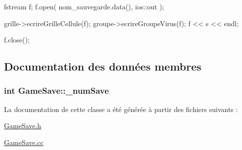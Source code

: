 \begin{DoxyCode}
{
        fstream f;
        f.open( nom_sauvegarde.data(), ios::out );
        
        grille->ecrireGrilleCellule(f);
        groupe->ecrireGroupeVirus(f);
        f << s << endl;
        
        f.close();
}
\end{DoxyCode}


\subsection{Documentation des données membres}
\hypertarget{classGameSave_a4d8d919bdbe2b6a4d77214ef066b6cc1}{
\subsubsection[{\_\-numSave}]{\setlength{\rightskip}{0pt plus 5cm}int {\bf GameSave::\_\-numSave}}}
\label{classGameSave_a4d8d919bdbe2b6a4d77214ef066b6cc1}


La documentation de cette classe a été générée à partir des fichiers suivants :\begin{DoxyCompactItemize}
\item 
\hyperlink{GameSave_8h}{GameSave.h}\item 
\hyperlink{GameSave_8cc}{GameSave.cc}\end{DoxyCompactItemize}

